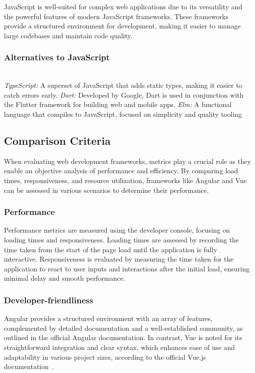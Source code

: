 \documentclass[conference]{IEEEtran}
\begin{document}
JavaScript is well-suited for complex web applications due to its versatility and the powerful features of modern JavaScript frameworks. These frameworks provide a structured environment for development, making it easier to manage large codebases and maintain code quality.
\newline
\subsubsection{Alternatives to JavaScript}

\textit{\\TypeScript:} A superset of JavaScript that adds static types, making it easier to catch errors early.
\newline\textit{Dart:} Developed by Google, Dart is used in conjunction with the Flutter framework for building web and mobile apps.
\newline\textit{Elm:} A functional language that compiles to JavaScript, focused on simplicity and quality tooling~\cite{mdn-js-guide}

\subsection {Comparison Criteria}

When evaluating web development frameworks, metrics play a crucial role as they enable an objective analysis of performance and efficiency. By comparing load times, responsiveness, and resource utilization, frameworks like Angular and Vue can be assessed in various scenarios to determine their performance.
\newline
\subsubsection{Performance}
Performance metrics are measured using the developer console, focusing on loading times and responsiveness. Loading times are assessed by recording the time taken from the start of the page load until the application is fully interactive. Responsiveness is evaluated by measuring the time taken for the application to react to user inputs and interactions after the initial load, ensuring minimal delay and smooth performance.
\newline\subsubsection{Developer-friendliness}
Angular provides a structured environment with an array of features, complemented by detailed documentation and a well-established community, as outlined in the official Angular documentation. In contrast, Vue is noted for its straightforward integration and clear syntax, which enhances ease of use and adaptability in various project sizes, according to the official Vue.js documentation~\cite{angular, vue}.
\newline
\end{document}
